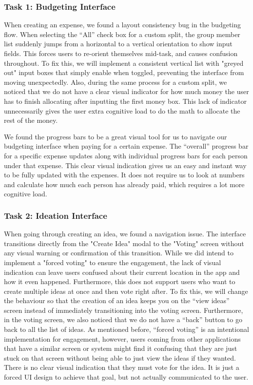 \documentclass[12pt,a4paper]{article}
\begin{document}
\subsubsection{Task 1: Budgeting Interface} 
\par
\indent
When creating an expense, we found a layout consistency bug in the budgeting flow. When selecting the “All” check box for a custom split, the group member list suddenly jumps from a horizontal to a vertical orientation to show input fields. This forces users to re-orient themselves mid-task, and causes confusion throughout. To fix this, we will implement a consistent vertical list with "greyed out" input boxes that simply enable when toggled, preventing the interface from moving unexpectedly. Also, during the same process for a custom split, we noticed that we do not have a clear visual indicator for how much money the user has to finish allocating after inputting the first money box. This lack of indicator unnecessarily gives the user extra cognitive load to do the math to allocate the rest of the money. 
\newline
\par
\indent
We found the progress bars to be a great visual tool for us to navigate our budgeting interface when paying for a certain expense. The “overall” progress bar for a specific expense updates along with individual progress bars for each person under that expense. This clear visual indication gives us an easy and instant way to be fully updated with the expenses. It does not require us to look at numbers and calculate how much each person has already paid, which requires a lot more cognitive load. 


\subsubsection{Task 2: Ideation Interface} 
When going through creating an idea, we found a navigation issue. The interface transitions directly from the "Create Idea" modal to the "Voting" screen without any visual warning or confirmation of this transition. While we did intend to implement a "forced voting" to ensure the engagement, the lack of visual indication can leave users confused about their current location in the app and how it even happened. Furthermore, this does not support users who want to create multiple ideas at once and then vote right after. To fix this, we will change the behaviour so that the creation of an idea keeps you on the “view ideas” screen instead of immediately transitioning into the voting screen. Furthermore, in the voting screen, we also noticed that we do not have a “back” button to go back to all the list of ideas. As mentioned before, “forced voting” is an intentional implementation for engagement, however, users coming from other applications that have a similar screen or system might find it confusing that they are just stuck on that screen without being able to just view the ideas if they wanted. There is no clear visual indication that they must vote for the idea. It is just a forced UI design to achieve that goal, but not actually communicated to the user. \newline
\end{document}
